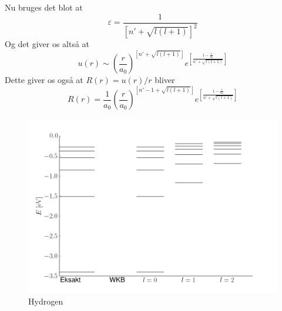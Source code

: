 Nu bruges det blot at
\begin{equation}
  \varepsilon = \frac{1}{\left[n'+\sqrt{l(l+1)}\right]^2}
\end{equation}
Og det giver os altså at
\begin{equation}
  u(r) \sim {\left(\frac{r}{a_0}\right)}^{\left[n'+\sqrt{l(l+1)}\right]} e^{\left[\frac{1-\frac{r}{a_0}}{n'+\sqrt{l(l+1)}}\right]}
\end{equation}
Dette giver os også at $R(r) = u(r)/r$ bliver
\begin{equation}
  R(r) = \frac{1}{a_0}{\left(\frac{r}{a_0}\right)}^{\left[n'-1+\sqrt{l(l+1)}\right]} e^{\left[\frac{1-\frac{r}{a_0}}{n'+\sqrt{l(l+1)}}\right]}
\end{equation}


\begin{figure}[h!]
    \centering
    \includegraphics[width=\columnwidth]{energyPlot}
    \caption{Hydrogen}
    \label{fig:hydrogen}
\end{figure}


%
